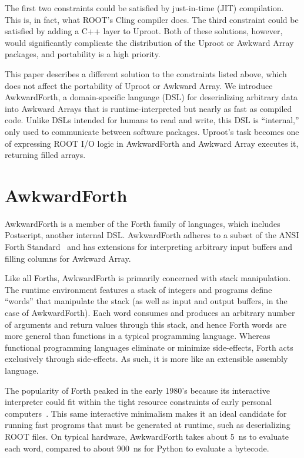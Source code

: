\documentclass{webofc}
\begin{document}
The first two constraints could be satisfied by just-in-time (JIT) compilation. This is, in fact, what ROOT's Cling compiler does. The third constraint could be satisfied by adding a C++ layer to Uproot. Both of these solutions, however, would significantly complicate the distribution of the Uproot or Awkward Array packages, and portability is a high priority.

This paper describes a different solution to the constraints listed above, which does not affect the portability of Uproot or Awkward Array. We introduce AwkwardForth, a domain-specific language (DSL) for deserializing arbitrary data into Awkward Arrays that is runtime-interpreted but nearly as fast as compiled code. Unlike DSLs intended for humans to read and write, this DSL is ``internal,'' only used to communicate between software packages. Uproot's task becomes one of expressing ROOT I/O logic in AwkwardForth and Awkward Array executes it, returning filled arrays.

\section{AwkwardForth}

AwkwardForth is a member of the Forth family of languages, which includes Postscript, another internal DSL. AwkwardForth adheres to a subset of the ANSI Forth Standard~\cite{forth-standard} and has extensions for interpreting arbitrary input buffers and filling columns for Awkward Array.

Like all Forths, AwkwardForth is primarily concerned with stack manipulation. The runtime environment features a stack of integers and programs define ``words'' that manipulate the stack (as well as input and output buffers, in the case of AwkwardForth). Each word consumes and produces an arbitrary number of arguments and return values through this stack, and hence Forth words are more general than functions in a typical programming language. Whereas functional programming languages eliminate or minimize side-effects, Forth acts exclusively through side-effects. As such, it is more like an extensible assembly language.

The popularity of Forth peaked in the early 1980's because its interactive interpreter could fit within the tight resource constraints of early personal computers~\cite{forth}. This same interactive minimalism makes it an ideal candidate for running fast programs that must be generated at runtime, such as deserializing ROOT files. On typical hardware, AwkwardForth takes about 5~ns to evaluate each word, compared to about 900~ns for Python to evaluate a bytecode.
\end{document}
